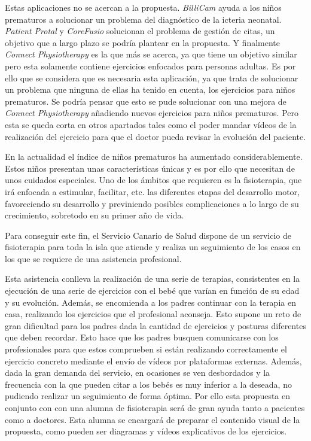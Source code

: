 \medskip
Estas aplicaciones no se acercan a la propuesta. \textit{BilliCam} ayuda
a los niños prematuros a solucionar un problema del diagnóstico de la icteria neonatal.
\textit{Patient Protal} y \textit{CoreFusio} solucionan el problema de gestión de citas, un
objetivo que a largo plazo se podría plantear en la propuesta. Y finalmente
\textit{Connect Physiotherapy} es la que más se acerca, ya que tiene un objetivo similar
pero esta solamente contiene ejercicios enfocados para personas adultas. Es por ello que
se considera que es necesaria esta aplicación, ya que trata de solucionar un problema que
ninguna de ellas ha tenido en cuenta, los ejercicios para niños prematuros. Se podría pensar
que esto se pude solucionar con una mejora de \textit{Connect Physiotherapy} añadiendo nuevos
ejercicios para niños prematuros. Pero esta se
queda corta en otros apartados tales como el poder mandar vídeos de la realización del
ejercicio para que el doctor pueda revisar la evolución del paciente.

\bigskip
En la actualidad el índice de niños prematuros ha aumentado considerablemente. Estos niños presentan
unas características únicas y es por ello que necesitan de unos cuidados especiales. Uno de los
ámbitos que requieren es la fisioterapia, que irá enfocada a estimular, facilitar, etc. las
diferentes etapas del desarrollo motor, favoreciendo su desarrollo y previniendo posibles
complicaciones a lo largo de su crecimiento, sobretodo en su primer año de vida.

Para conseguir este fin, el Servicio Canario de Salud dispone de un servicio de fisioterapia
para toda la isla que atiende y realiza un seguimiento de los casos en los que se requiere de
una asistencia profesional.

Esta asistencia conlleva la realización de una serie de terapias, consistentes en
la ejecución de una serie de ejercicios con el bebé que varían en función de su edad y su
evolución. Además, se encomienda a los padres continuar con la terapia en casa, realizando
los ejercicios que el profesional aconseja. Esto supone un reto de gran dificultad para los
padres dada la cantidad de ejercicios y posturas diferentes que deben recordar. Esto hace que
los padres busquen comunicarse con los profesionales para que estos comprueben si están
realizando correctamente el ejercicio concreto mediante el envío de vídeos por plataformas
externas. Además, dada la gran demanda del servicio, en ocasiones se ven desbordados y la
frecuencia con la que pueden citar a los bebés es muy inferior a la deseada, no pudiendo
realizar un seguimiento de forma óptima. Por ello esta propuesta en conjunto
con con una alumna de fisioterapia será de gran ayuda tanto
a pacientes como a doctores. Esta alumna se encargará de preparar el
contenido visual de la propuesta, como pueden ser diagramas y vídeos
explicativos de los ejercicios.

